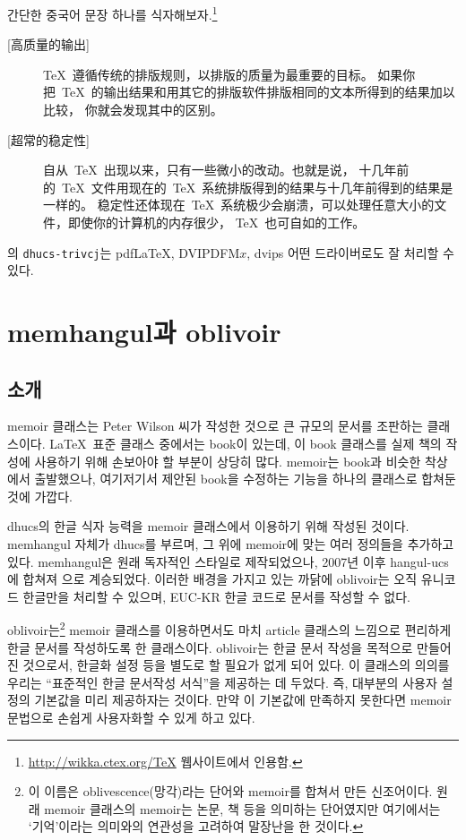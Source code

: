 간단한 중국어 문장 하나를 식자해보자.\footnote{\url{http://wikka.ctex.org/TeX} 웹사이트에서
인용함.}

\begin{chinese}
\begin{description}
\item[{[}高质量的输出{]}] TeX~遵循传统的排版规则，以排版的质量为最重要的目标。
   如果你把~TeX~的输出结果和用其它的排版软件排版相同的文本所得到的结果加以比较，
   你就会发现其中的区别。
    
\item[{[}超常的稳定性{]}] 自从~TeX~出现以来，只有一些微小的改动。也就是说，
  十几年前的~TeX~文件用现在的~TeX~系统排版得到的结果与十几年前得到的结果是一样的。
  稳定性还体现在~TeX~系统极少会崩溃，可以处理任意大小的文件，即使你的计算机的内存很少，
  TeX~也可自如的工作。
\end{description}
\end{chinese}

\kotex 의 \texttt{dhucs-trivcj}는 pdf\LaTeX, DVIPDFM$x$, dvips
어떤 드라이버로도 잘 처리할 수 있다. 


\chapter{memhangul과 oblivoir}

\section{소개}

%
memoir 클래스는 Peter Wilson 씨가 작성한 것으로 큰 규모의 문서를
조판하는 클래스이다. \LaTeX\ 표준 클래스 중에서는 book이 있는데,
이 book 클래스를 실제 책의 작성에 사용하기 위해 손보아야 할 부분이
상당히 많다. memoir는 book과 비슷한 착상에서 출발했으나, 여기저기서
제안된 book을 수정하는 기능을 하나의 클래스로 합쳐둔 것에 가깝다. 

\는 dhucs의 한글 식자 능력을 memoir 클래스에서
이용하기 위해 작성된 것이다. memhangul 자체가 dhucs를 부르며,
그 위에 memoir에 맞는 여러 정의들을 추가하고 있다. memhangul은
원래 독자적인 스타일로 제작되었으나, 2007년 이후 hangul-ucs에
합쳐져 \kotex 으로 계승되었다.
이러한 배경을 가지고 있는 까닭에 oblivoir는 오직 유니코드
한글만을 처리할 수 있으며, EUC-KR 한글 코드로 문서를 작성할
수 없다. 

oblivoir는\footnote{%
  이 이름은 oblivescence(망각)라는 단어와 memoir를
  합쳐서 만든 신조어이다. 원래 memoir 클래스의 memoir는
  논문, 책 등을 의미하는 단어였지만 여기에서는 `기억'이라는
  의미와의 연관성을 고려하여 말장난을 한 것이다.}
memoir 클래스를 이용하면서도 마치 article 클래스의
느낌으로 편리하게 한글 문서를 작성하도록 한 클래스이다. oblivoir는
한글 문서 작성을 목적으로 만들어진 것으로서, 한글화 설정 등을
별도로 할 필요가 없게 되어 있다. 
이 클래스의 의의를 우리는 ``표준적인 한글 문서작성 서식''을
제공하는 데 두었다. 즉, 대부분의 사용자 설정의 기본값을 미리
제공하자는 것이다. 만약 이 기본값에 만족하지 못한다면
memoir 문법으로 손쉽게 사용자화할 수 있게 하고 있다.

